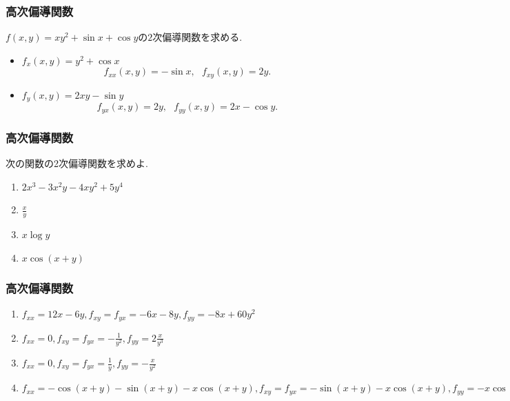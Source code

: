 

\begin{frame}
\frametitle{高次偏導関数}

$f(x,y)=xy^2+\sin x + \cos y$の$2$次偏導関数を求める. 

\begin{itemize}
\item $f_x(x,y)=y^2+\cos x$
$$
f_{xx}(x,y)=-\sin x, \ \ \ f_{xy}(x,y)=2y. 
$$
\item $f_y(x,y)=2xy-\sin y$
$$
f_{yx}(x,y)=2y, \ \ \ f_{yy}(x,y)=2x-\cos y. 
$$
\end{itemize}
\end{frame}




\begin{frame}
\frametitle{高次偏導関数}

\begin{Prob}
次の関数の2次偏導関数を求めよ. 
\begin{enumerate}
\item $2x^3-3x^2y-4xy^2+5y^4$
\item $\frac{x}{y}$
\item $x \log y$
\item $x \cos(x+y)$
\end{enumerate}
\end{Prob}

\end{frame}



\begin{frame}
\frametitle{高次偏導関数}


\begin{enumerate}
\item $f_{xx}=12x-6y, f_{xy}=f_{yx}=-6x-8y, f_{yy}=-8x+60y^2$
\item $f_{xx}=0, f_{xy}=f_{yx}=-\frac{1}{y^2}, f_{yy}=2\frac{x}{y^3}$
\item $f_{xx}=0, f_{xy}=f_{yx}=\frac{1}{y}, f_{yy}=-\frac{x}{y^2}$
\item $f_{xx}=-\cos(x+y)-\sin(x+y)-x\cos(x+y), f_{xy}=f_{yx}=-\sin(x+y)-x\cos(x+y), f_{yy}=-x\cos(x+y)$
\end{enumerate}

\end{frame}

